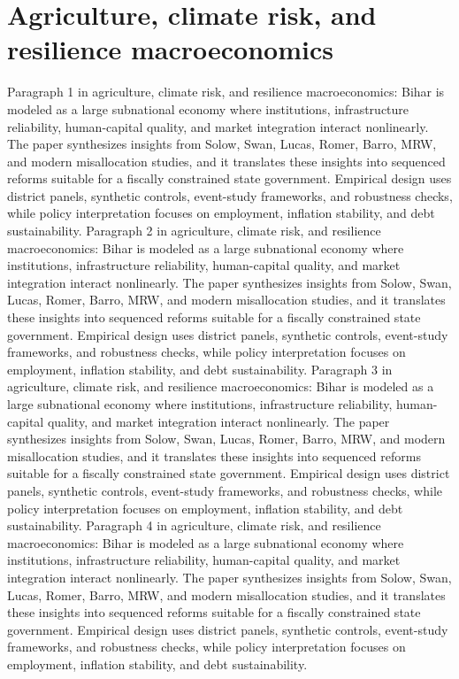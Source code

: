 \documentclass[preprint,12pt]{elsarticle}
\begin{document}
\section{Agriculture, climate risk, and resilience macroeconomics}
Paragraph 1 in agriculture, climate risk, and resilience macroeconomics: Bihar is modeled as a large subnational economy where institutions, infrastructure reliability, human-capital quality, and market integration interact nonlinearly. The paper synthesizes insights from Solow, Swan, Lucas, Romer, Barro, MRW, and modern misallocation studies, and it translates these insights into sequenced reforms suitable for a fiscally constrained state government. Empirical design uses district panels, synthetic controls, event-study frameworks, and robustness checks, while policy interpretation focuses on employment, inflation stability, and debt sustainability.
Paragraph 2 in agriculture, climate risk, and resilience macroeconomics: Bihar is modeled as a large subnational economy where institutions, infrastructure reliability, human-capital quality, and market integration interact nonlinearly. The paper synthesizes insights from Solow, Swan, Lucas, Romer, Barro, MRW, and modern misallocation studies, and it translates these insights into sequenced reforms suitable for a fiscally constrained state government. Empirical design uses district panels, synthetic controls, event-study frameworks, and robustness checks, while policy interpretation focuses on employment, inflation stability, and debt sustainability.
Paragraph 3 in agriculture, climate risk, and resilience macroeconomics: Bihar is modeled as a large subnational economy where institutions, infrastructure reliability, human-capital quality, and market integration interact nonlinearly. The paper synthesizes insights from Solow, Swan, Lucas, Romer, Barro, MRW, and modern misallocation studies, and it translates these insights into sequenced reforms suitable for a fiscally constrained state government. Empirical design uses district panels, synthetic controls, event-study frameworks, and robustness checks, while policy interpretation focuses on employment, inflation stability, and debt sustainability.
Paragraph 4 in agriculture, climate risk, and resilience macroeconomics: Bihar is modeled as a large subnational economy where institutions, infrastructure reliability, human-capital quality, and market integration interact nonlinearly. The paper synthesizes insights from Solow, Swan, Lucas, Romer, Barro, MRW, and modern misallocation studies, and it translates these insights into sequenced reforms suitable for a fiscally constrained state government. Empirical design uses district panels, synthetic controls, event-study frameworks, and robustness checks, while policy interpretation focuses on employment, inflation stability, and debt sustainability.
\end{document}
